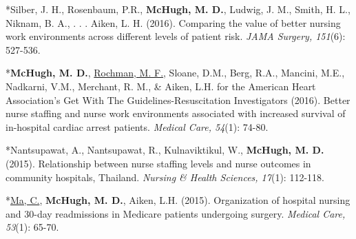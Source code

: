 \documentclass[10pt,]{article}
\begin{document}
{{{{{{{{{{{{{{{\vspace{4mm}

\begin{hangparas}{.25in}{1}

*Silber, J. H., Rosenbaum, P.R., {\textbf {McHugh, M. D.}}, Ludwig, J. M., Smith, H. L., Niknam, B. A., . . . Aiken, L. H. (2016). Comparing the value of better nursing work environments across different levels of patient risk. {\textit {JAMA Surgery, 151}}(6): 527-536.

\end{hangparas}

\vspace{4mm}

\begin{hangparas}{.25in}{1}

*{\textbf {McHugh, M. D.}}, {\underline {Rochman, M. F.}}, Sloane, D.M., Berg, R.A., Mancini, M.E., Nadkarni, V.M., Merchant, R. M., \& Aiken, L.H. for the American Heart Association’s Get With The Guidelines-Resuscitation Investigators (2016). Better nurse staffing and nurse work environments associated with increased survival of in-hospital cardiac arrest patients. {\textit {Medical Care, 54}}(1): 74-80.

\end{hangparas}

\vspace{4mm}

\begin{hangparas}{.25in}{1}

*Nantsupawat, A., Nantsupawat, R., Kulnaviktikul, W., {\textbf {McHugh, M. D.}} (2015). Relationship between nurse staffing levels and nurse outcomes in community hospitals, Thailand. {\textit {Nursing \& Health Sciences, 17}}(1): 112-118.

\end{hangparas}

\vspace{4mm}

\begin{hangparas}{.25in}{1}

*{\underline {Ma, C.}}, {\textbf {McHugh, M. D.}}, Aiken, L.H. (2015). Organization of hospital nursing and 30-day readmissions in Medicare patients undergoing surgery. {\textit {Medical Care, 53}}(1): 65-70.

\end{hangparas}

\vspace{4mm}

\begin{hangparas}{.25in}{1}


\end{hangparas}}}}}}}}}}}}}}}}
\end{document}
